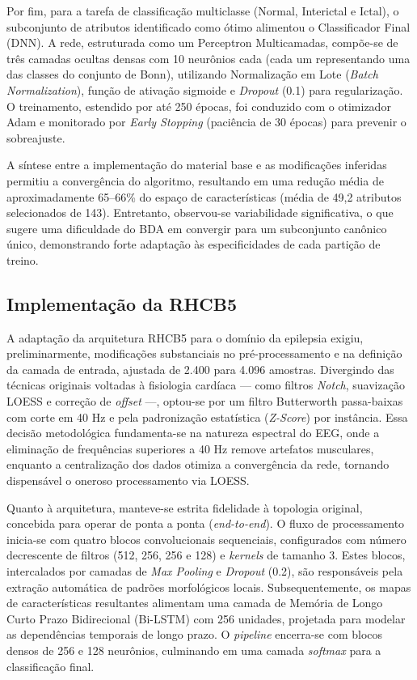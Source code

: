 \documentclass[alpha-refs,brazilian]{CC-EC_TF-TC}
\begin{document}
Por fim, para a tarefa de classificação multiclasse (Normal, Interictal e Ictal), o subconjunto de atributos identificado como ótimo alimentou o Classificador Final (DNN). A rede, estruturada como um Perceptron Multicamadas, compõe-se de três camadas ocultas densas com 10 neurônios cada (cada um representando uma das classes do conjunto de Bonn), utilizando Normalização em Lote (\textit{Batch Normalization}), função de ativação sigmoide e \textit{Dropout} (0.1) para regularização. O treinamento, estendido por até 250 épocas, foi conduzido com o otimizador Adam e monitorado por \textit{Early Stopping} (paciência de 30 épocas) para prevenir o sobreajuste.

A síntese entre a implementação do material base e as modificações inferidas permitiu a convergência do algoritmo, resultando em uma redução média de aproximadamente 65--66\% do espaço de características (média de 49,2 atributos selecionados de 143). Entretanto, observou-se variabilidade significativa, o que sugere uma dificuldade do BDA em convergir para um subconjunto canônico único, demonstrando forte adaptação às especificidades de cada partição de treino.

\subsection{Implementação da RHCB5}

A adaptação da arquitetura RHCB5 para o domínio da epilepsia exigiu, preliminarmente, modificações substanciais no pré-processamento e na definição da camada de entrada, ajustada de 2.400 para 4.096 amostras. Divergindo das técnicas originais voltadas à fisiologia cardíaca — como filtros \textit{Notch}, suavização LOESS e correção de \textit{offset} —, optou-se por um filtro Butterworth passa-baixas com corte em 40 Hz e pela padronização estatística (\textit{Z-Score}) por instância. Essa decisão metodológica fundamenta-se na natureza espectral do EEG, onde a eliminação de frequências superiores a 40 Hz remove artefatos musculares, enquanto a centralização dos dados otimiza a convergência da rede, tornando dispensável o oneroso processamento via LOESS.

Quanto à arquitetura, manteve-se estrita fidelidade à topologia original, concebida para operar de ponta a ponta (\textit{end-to-end}). O fluxo de processamento inicia-se com quatro blocos convolucionais sequenciais, configurados com número decrescente de filtros (512, 256, 256 e 128) e \textit{kernels} de tamanho 3. Estes blocos, intercalados por camadas de \textit{Max Pooling} e \textit{Dropout} (0.2), são responsáveis pela extração automática de padrões morfológicos locais. Subsequentemente, os mapas de características resultantes alimentam uma camada de Memória de Longo Curto Prazo Bidirecional (Bi-LSTM) com 256 unidades, projetada para modelar as dependências temporais de longo prazo. O \textit{pipeline} encerra-se com blocos densos de 256 e 128 neurônios, culminando em uma camada \textit{softmax} para a classificação final.
\end{document}
